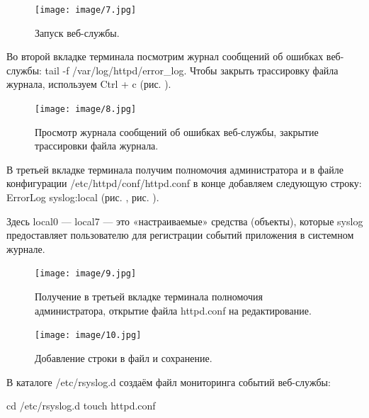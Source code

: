 \documentclass[
  english,
  russian,
  12pt,
  a4paper,
  DIV=11,
  numbers=noendperiod]{scrreprt}
\begin{document}
\begin{figure}

{\centering \texttt{[image: image/7.jpg]}

}

\caption{Запуск веб-службы.}

\end{figure}%

Во второй вкладке терминала посмотрим журнал сообщений об ошибках веб-
службы: tail -f /var/log/httpd/error\_log. Чтобы закрыть трассировку
файла журнала, используем Ctrl + c (рис. \autocite*{fig:008}).

\begin{figure}

{\centering \texttt{[image: image/8.jpg]}

}

\caption{Просмотр журнала сообщений об ошибках веб-службы, закрытие
трассировки файла журнала.}

\end{figure}%

В третьей вкладке терминала получим полномочия администратора и в файле
конфигурации /etc/httpd/conf/httpd.conf в конце добавляем следующую
строку: ErrorLog syslog:local (рис. \autocite*{fig:009}, рис.
\autocite*{fig:010}).

Здесь local0 --- local7 --- это «настраиваемые» средства (объекты),
которые syslog предоставляет пользователю для регистрации событий
приложения в системном журнале.

\begin{figure}

{\centering \texttt{[image: image/9.jpg]}

}

\caption{Получение в третьей вкладке терминала полномочия
администратора, открытие файла httpd.conf на редактирование.}

\end{figure}%

\begin{figure}

{\centering \texttt{[image: image/10.jpg]}

}

\caption{Добавление строки в файл и сохранение.}

\end{figure}%

В каталоге /etc/rsyslog.d создаём файл мониторинга событий веб-службы:

cd /etc/rsyslog.d touch httpd.conf
\end{document}

